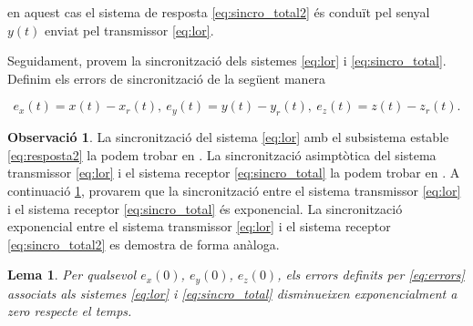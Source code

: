 \documentclass[11pt,a4paper,openright,oneside]{article}
\numberwithin{equation}{section}
\newtheorem{lema}[teo]{Lema}
\theoremstyle{definition}
\newtheorem{obs}[teo]{Observaci\'o}
\begin{document}
en aquest cas el sistema de resposta \eqref{eq:sincro_total2} és conduït pel senyal $y(t)$ enviat pel transmissor \eqref{eq:lor}.

Seguidament, provem la sincronització dels sistemes \eqref{eq:lor} i \eqref{eq:sincro_total}. Definim els errors de sincronització de la següent manera

\begin{equation} \label{eq:errors}
    e_x(t) = x(t) - x_r(t), \ e_y(t) = y(t) - y_r(t), \ e_z(t) = z(t) - z_r(t).
\end{equation}

\begin{obs}
    La sincronització del sistema \eqref{eq:lor} amb el subsistema estable \eqref{eq:resposta2} la podem trobar en \cite{Pecora_1}. La sincronització asimptòtica del sistema transmissor \eqref{eq:lor} i el sistema receptor \eqref{eq:sincro_total} la podem trobar en \cite{Cuomo}. A continuació \ref{lema:sincro_lema}, provarem que la sincronització entre el sistema transmissor \eqref{eq:lor} i el sistema receptor \eqref{eq:sincro_total} és exponencial. La sincronització exponencial entre el sistema transmissor \eqref{eq:lor} i el sistema receptor \eqref{eq:sincro_total2} es demostra de forma anàloga.
\end{obs}

\begin{lema} \label{lema:sincro_lema}
    Per qualsevol $e_x(0)$, $e_y(0)$, $e_z(0)$, els errors definits per \eqref{eq:errors} associats als sistemes \eqref{eq:lor} i \eqref{eq:sincro_total} disminueixen exponencialment a zero respecte el temps.
\end{lema}
\end{document}
